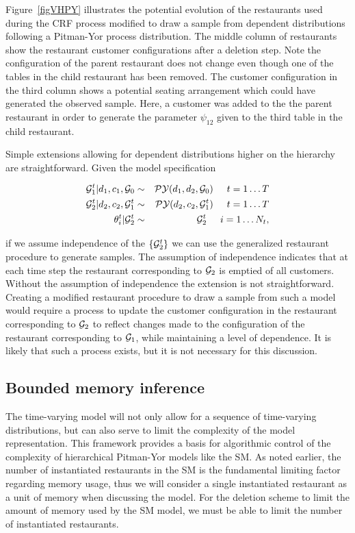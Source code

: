Figure~\ref{figVHPY} illustrates the potential evolution of the restaurants used during the CRF process modified to draw a sample from dependent distributions following a Pitman-Yor process distribution.  The middle column of restaurants show the restaurant customer configurations after a deletion step.  Note the configuration of the parent restaurant does not change even though one of the tables in the child restaurant has been removed.  The customer configuration in the third column shows a potential seating arrangement which could have generated the observed sample.  Here, a customer was added to the the parent restaurant in order to generate the parameter $\psi_{12}$  given to the third table in the child restaurant.

Simple extensions allowing for dependent distributions higher on the hierarchy are straightforward.  Given the model specification

\begin{eqnarray*}
\G_1^t | d_1, c_1, \G_0  &\sim& \PY(d_1,d_2,\G_0) \hspace{.5cm} t = 1\dots T\\
\G_2^t | d_2, c_2, \G_1^t &\sim& \PY(d_2, c_2, \G_1^t)  \hspace{.5cm} t = 1\dots T\\
\theta^t_i | \G_2^t &\sim& \G_2^t \hspace{.5cm} i = 1\dots N_t, 
\end{eqnarray*}

if we assume independence of the $\{ \G_2^t \}$ we can use the generalized restaurant procedure to generate samples. The assumption of independence indicates that at each time step the restaurant corresponding to $\G_2$ is emptied of all customers. Without the assumption of independence the extension is not straightforward. Creating a modified restaurant procedure to draw a sample from such a model would require a process to update the customer configuration in the restaurant corresponding to $\G_2$ to reflect changes made to the configuration of the restaurant corresponding to $\G_1$, while maintaining a level of dependence.  It is likely that such a process exists, but it is not necessary for this discussion.

\subsection{Bounded memory inference}

The time-varying model will not only allow for a sequence of time-varying distributions, but can also serve to limit the complexity of the model representation. This framework provides a basis for algorithmic control of the complexity of hierarchical Pitman-Yor models like the SM.  As noted earlier, the number of instantiated restaurants in the SM is the fundamental limiting factor regarding memory usage, thus we will consider a single instantiated restaurant as a unit of memory when discussing the model. For the deletion scheme to limit the amount of memory used by the SM model, we must be able to limit the number of instantiated restaurants.


